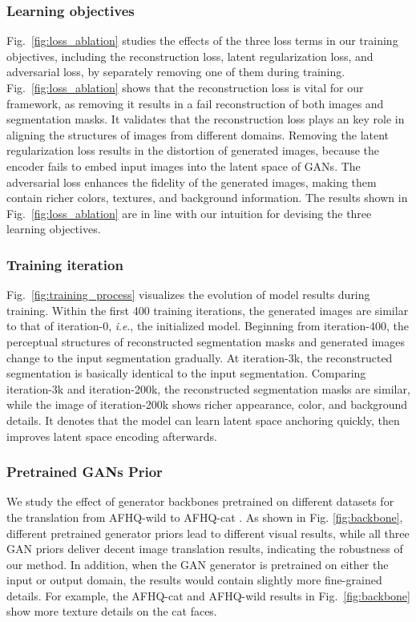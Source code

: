 \documentclass[10pt,journal,compsoc]{IEEEtran}
\newcommand{\ie}{\textit{i}.\textit{e}.}
\begin{document}
{\subsubsection{Learning objectives} 
Fig.~\ref{fig:loss_ablation} studies the effects of the three loss terms in our training objectives, including the reconstruction loss, latent regularization loss, and adversarial loss, by separately removing one of them during training. Fig.~\ref{fig:loss_ablation} shows that the reconstruction loss is vital for our framework, as removing it results in a fail reconstruction of both images and segmentation masks. It validates that the reconstruction loss plays an key role in aligning the structures of images from different domains. Removing the latent regularization loss results in the distortion of generated images, because the encoder fails to embed input images into the latent space of GANs. The adversarial loss enhances the fidelity of the generated images, making them contain richer colors, textures, and background information. The results shown in Fig.~\ref{fig:loss_ablation} are in line with our intuition for devising the three learning objectives. 

\subsubsection{Training iteration} Fig.~\ref{fig:training_process} visualizes the evolution of model results during training. Within the first 400 training iterations, the generated images are similar to that of iteration-0, \ie, the initialized model. Beginning from iteration-400, the perceptual structures of reconstructed segmentation masks and generated images change to the input segmentation gradually. At iteration-3k, the reconstructed segmentation is basically identical to the input segmentation. Comparing iteration-3k and iteration-200k, the reconstructed segmentation masks are similar, while the image of iteration-200k shows richer appearance, color, and background details. It denotes that the model can learn latent space anchoring quickly, then improves latent space encoding afterwards.


\subsubsection{Pretrained GANs Prior}
We study the effect of generator backbones pretrained on different datasets for the translation from AFHQ-wild to AFHQ-cat \cite{starganv2}. As shown in Fig. \ref{fig:backbone}, different pretrained generator priors lead to different visual results, while all three GAN priors deliver decent image translation results, indicating the robustness of our method. In addition, when the GAN generator is pretrained on either the input or output domain, the results would contain slightly more fine-grained details. For example, the AFHQ-cat and AFHQ-wild results in Fig.~\ref{fig:backbone} show more texture details on the cat faces.


}
\end{document}
